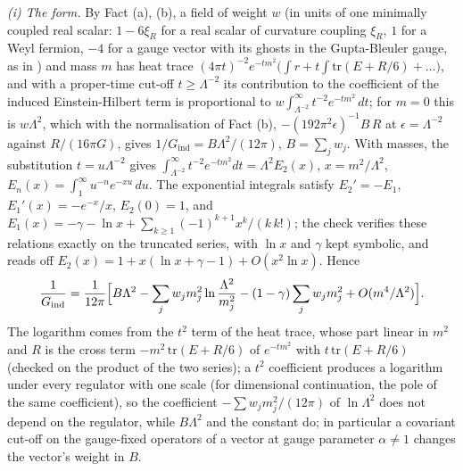 \emph{(i) The form.} By Fact (a), (b), a field of weight $w$ (in units of one minimally coupled real scalar: $1 - 6\xi_{R}$ for a real scalar of curvature coupling $\xi_{R}$, $1$ for a Weyl fermion, $-4$ for a gauge vector with its ghosts in the Gupta-Bleuler gauge, as in ) and mass $m$ has heat trace $(4\pi t)^{-2}e^{-tm^{2}}\bigl(\int r + t\int\mathrm{tr}(E + R/6) + \dots\bigr)$, and with a proper-time cut-off $t \ge \Lambda^{-2}$ its contribution to the coefficient of the induced Einstein-Hilbert term is proportional to $w\int_{\Lambda^{-2}}^{\infty}t^{-2}e^{-tm^{2}}\,dt$; for $m = 0$ this is $w\Lambda^{2}$, which with the normalisation of Fact (b), $-(192\pi^{2}\epsilon)^{-1}B\,R$ at $\epsilon = \Lambda^{-2}$ against $R/(16\pi G)$, gives $1/G_{\mathrm{ind}} = B\Lambda^{2}/(12\pi)$, $B = \sum_{j}w_{j}$. With masses, the substitution $t = u\Lambda^{-2}$ gives $\int_{\Lambda^{-2}}^{\infty}t^{-2}e^{-tm^{2}}dt = \Lambda^{2}E_{2}(x)$, $x = m^{2}/\Lambda^{2}$, $E_{n}(x) = \int_{1}^{\infty}u^{-n}e^{-xu}\,du$. The exponential integrals satisfy $E_{2}' = -E_{1}$, $E_{1}'(x) = -e^{-x}/x$, $E_{2}(0) = 1$, and $E_{1}(x) = -\gamma - \ln x + \sum_{k \ge 1}(-1)^{k+1}x^{k}/(k\,k!)$; the check verifies these relations exactly on the truncated series, with $\ln x$ and $\gamma$ kept symbolic, and reads off $E_{2}(x) = 1 + x(\ln x + \gamma - 1) + O(x^{2}\ln x)$. Hence
\[
\frac{1}{G_{\mathrm{ind}}} = \frac{1}{12\pi}\Bigl[B\Lambda^{2} - \sum_{j}w_{j}m_{j}^{2}\ln\frac{\Lambda^{2}}{m_{j}^{2}} - (1 - \gamma)\sum_{j}w_{j}m_{j}^{2} + O(m^{4}/\Lambda^{2})\Bigr].
\]
The logarithm comes from the $t^{2}$ term of the heat trace, whose part linear in $m^{2}$ and $R$ is the cross term $-m^{2}\,\mathrm{tr}(E + R/6)$ of $e^{-tm^{2}}$ with $t\,\mathrm{tr}(E + R/6)$ (checked on the product of the two series); a $t^{2}$ coefficient produces a logarithm under every regulator with one scale (for dimensional continuation, the pole of the same coefficient), so the coefficient $-\sum w_{j}m_{j}^{2}/(12\pi)$ of $\ln\Lambda^{2}$ does not depend on the regulator, while $B\Lambda^{2}$ and the constant do; in particular a covariant cut-off on the gauge-fixed operators of a vector at gauge parameter $\alpha \neq 1$ changes the vector's weight in $B$.


